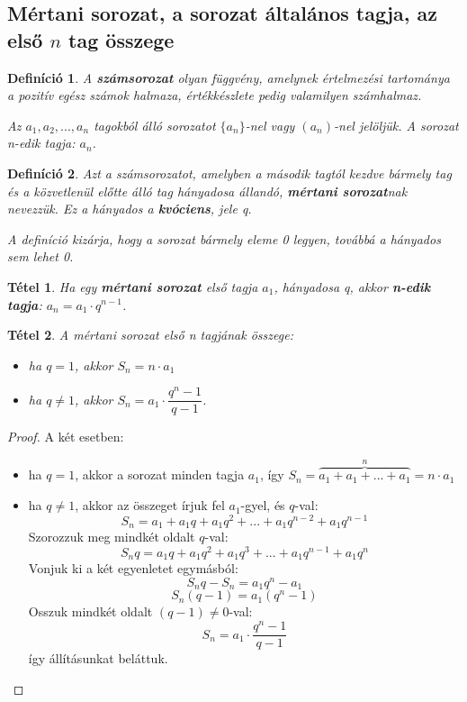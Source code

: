 \documentclass[12pt,a4paper]{article}
\newtheorem{theorem}{Tétel} [section]
\newtheorem{definition}{Definíció} [section]
\begin{document}
\subsection{Mértani sorozat, a sorozat általános tagja, az első $n$ tag összege}
\begin{definition}
A \textbf{számsorozat} olyan függvény, amelynek értelmezési tartománya a pozitív egész számok halmaza, értékkészlete pedig valamilyen számhalmaz.

Az $a_1, a_2, ..., a_n$ tagokból álló sorozatot $\{a_n\}$-nel vagy $(a_n)$-nel jelöljük. A sorozat n-edik tagja: $a_n$.
\end{definition}

\begin{definition}
Azt a számsorozatot, amelyben a második tagtól kezdve bármely tag és a közvetlenül előtte álló tag hányadosa állandó, \textbf{mértani sorozat}nak nevezzük. Ez a hányados a \textbf{kvóciens}, jele q.

A definíció kizárja, hogy a sorozat bármely eleme 0 legyen, továbbá a hányados sem lehet 0.
\end{definition}

\begin{theorem}
Ha egy \textbf{mértani sorozat} első tagja $a_1$, hányadosa q, akkor \textbf{n-edik tagja}: $a_n=a_1\cdot q^{n-1}$.
\end{theorem}
\begin{theorem}
A mértani sorozat első n tagjának összege:
\begin{itemize}
\item ha $q=1$, akkor $S_n=n\cdot a_1$
\item ha $q\neq 1$, akkor $S_n=a_1\cdot \dfrac{q^{n}-1}{q-1}$.
\end{itemize}
\end{theorem}

\begin{proof}
A két esetben:
\begin{itemize}
\item ha $q=1$, akkor a sorozat minden tagja $a_1$, így $S_n=\overbrace{a_1+a_1+...+a_1}^{n}=n\cdot a_1$
\item ha $q\neq 1$, akkor az összeget írjuk fel $a_1$-gyel, és $q$-val:
$$S_n=a_1+a_1q+a_1q^{2}+...+a_1q^{n-2}+a_1q^{n-1}$$
Szorozzuk meg mindkét oldalt $q$-val:
$$S_nq=a_1q+a_1q^2+a_1q^{3}+...+a_1q^{n-1}+a_1q^{n}$$
Vonjuk ki a két egyenletet egymásból:
$$S_nq-S_n=a_1q^{n}-a_1$$
$$S_n(q-1)=a_1(q^n-1)$$
Osszuk mindkét oldalt $(q - 1) \neq 0$-val:
$$S_n=a_1\cdot \dfrac{q^{n}-1}{q-1}$$
így állításunkat beláttuk.
\end{itemize}
\end{proof}
\end{document}
